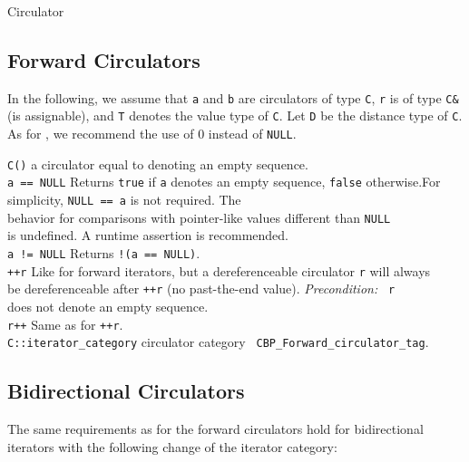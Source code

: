 \begin{ccRefConcept}{Circulator}
\subsection*{Forward Circulators}

In the following, we assume that {\tt a} and {\tt b} are circulators
of type {\tt C}, {\tt r} is of type {\tt C\&} (is assignable), and
{\tt T} denotes the value type of {\tt C}.  Let {\tt D} be the
distance type of {\tt C}.  As for \CC, we recommend the use of 0
instead of {\tt NULL}.

\begin{tabbing}
    {\tt C()}         \> a circulator equal to  denoting an 
                         empty sequence.\\
    {\tt a == NULL}   \> Returns {\tt true} if {\tt a} denotes an empty
                         sequence, {\tt false} otherwise.For 
                           simplicity, {\tt NULL == a} is not required. The\\
                      \> behavior for comparisons with pointer-like 
                         values different than {\tt NULL} \\
                      \> is undefined. A runtime assertion is 
                         recommended.\\
    {\tt a != NULL}   \> Returns {\tt !(a == NULL)}. \\
    {\tt ++r}         \> Like for forward iterators, but a dereferenceable
                         circulator {\tt r} will always\\
                      \> be dereferenceable after {\tt ++r} (no
                         past-the-end value). {\em Precondition:} {\tt
                           r} \\
                      \> does not denote an empty sequence.\\
    {\tt r++}         \> Same as for {\tt ++r}.\\
    {\tt C::iterator\_category} \>  circulator category {\tt 
                                      CBP\_Forward\_circulator\_tag}.
\end{tabbing}

\subsection*{Bidirectional Circulators}

The same requirements as for the forward circulators hold for
bidirectional iterators with the following change of the iterator
category:


\end{ccRefConcept}
